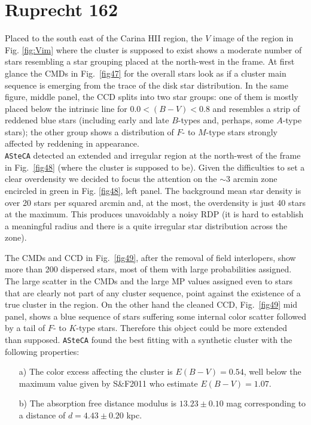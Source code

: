 \documentclass[referee]{aa}
\begin{document}
\section{Ruprecht 162}
\label{app:rup162}

Placed to the south east of the Carina HII region, the $V$ image of the region
in Fig. \ref{fig:Vim} where the cluster is supposed to exist shows a moderate
number of stars resembling a star grouping placed at the north-west in the
frame. At first glance the CMDs in Fig.~\ref{fig47} for the overall stars look
as if a cluster main sequence is emerging from the trace of the disk star
distribution.
In the same figure, middle panel, the CCD splits into two star groups: one of
them is mostly placed below the intrinsic line for $0.0<(B-V)< 0.8$ and
resembles a strip of reddened blue stars (including early and late $B$-types
and, perhaps, some $A$-type stars); the other group shows a distribution of $F$-
to $M$-type stars strongly affected by reddening in appearance.\\

\texttt{ASteCA} detected an extended and irregular region at the north-west of
the frame in Fig.~\ref{fig48} (where the cluster is supposed to be). Given the
difficulties to set a clear overdensity we decided to focus the attention on
the $\sim3$ arcmin zone encircled in green in Fig. \ref{fig48}, left panel.
The background mean star density is over 20 stars per squared arcmin and, at
the most, the overdensity is just 40 stars at the maximum. This produces
unavoidably a noisy RDP (it is hard to establish a meaningful radius and there
is a quite irregular star distribution across the zone).

The CMDs and CCD in Fig.~\ref{fig49}, after the removal of field interlopers,
show more than 200 dispersed stars, most of them with large probabilities
assigned. The large scatter in the CMDs and the large MP values assigned even
to stars that are clearly not part of any cluster sequence, point against the
existence of a true cluster in the region.
On the other hand the cleaned CCD, Fig.~\ref{fig49} mid panel, shows a blue
sequence of stars suffering some internal color scatter followed by a tail of
$F$- to $K$-type stars. Therefore this object could be more extended than
supposed. \texttt{ASteCA} found the best fitting with a synthetic cluster with
the following properties:

\begin{itemize}
\item [a)] The color excess affecting the cluster is $E(B-V)=0.54$, well
below the maximum value given by S\&F2011 who estimate $E(B-V)=1.07$.
\item [b)] The absorption free distance modulus is $13.23\pm0.10$ mag
corresponding to a distance of $d=4.43\pm0.20$ kpc.
\end{itemize}
\end{document}
